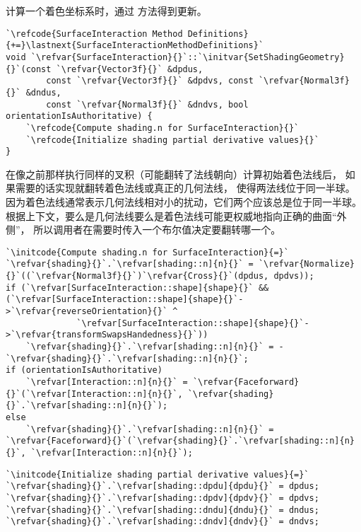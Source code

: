 计算一个着色坐标系时，通过
方法得到更新。
\begin{lstlisting}
`\refcode{SurfaceInteraction Method Definitions}{+=}\lastnext{SurfaceInteractionMethodDefinitions}`
void `\refvar{SurfaceInteraction}{}`::`\initvar{SetShadingGeometry}{}`(const `\refvar{Vector3f}{}` &dpdus,
        const `\refvar{Vector3f}{}` &dpdvs, const `\refvar{Normal3f}{}` &dndus,
        const `\refvar{Normal3f}{}` &dndvs, bool orientationIsAuthoritative) {
    `\refcode{Compute shading.n for SurfaceInteraction}{}`
    `\refcode{Initialize shading partial derivative values}{}`
}
\end{lstlisting}

在像之前那样执行同样的叉积（可能翻转了法线朝向）计算初始着色法线后，
如果需要的话实现就翻转着色法线或真正的几何法线，
使得两法线位于同一半球。
因为着色法线通常表示几何法线相对小的扰动，它们两个应该总是位于同一半球。
根据上下文，要么是几何法线要么是着色法线可能更权威地指向正确的曲面“外侧”，
所以调用者在需要时传入一个布尔值决定要翻转哪一个。
\begin{lstlisting}
`\initcode{Compute shading.n for SurfaceInteraction}{=}`
`\refvar{shading}{}`.`\refvar[shading::n]{n}{}` = `\refvar{Normalize}{}`((`\refvar{Normal3f}{}`)`\refvar{Cross}{}`(dpdus, dpdvs));
if (`\refvar[SurfaceInteraction::shape]{shape}{}` && (`\refvar[SurfaceInteraction::shape]{shape}{}`->`\refvar{reverseOrientation}{}` ^
              `\refvar[SurfaceInteraction::shape]{shape}{}`->`\refvar{transformSwapsHandedness}{}`))
    `\refvar{shading}{}`.`\refvar[shading::n]{n}{}` = -`\refvar{shading}{}`.`\refvar[shading::n]{n}{}`;
if (orientationIsAuthoritative)
    `\refvar[Interaction::n]{n}{}` = `\refvar{Faceforward}{}`(`\refvar[Interaction::n]{n}{}`, `\refvar{shading}{}`.`\refvar[shading::n]{n}{}`);
else
    `\refvar{shading}{}`.`\refvar[shading::n]{n}{}` = `\refvar{Faceforward}{}`(`\refvar{shading}{}`.`\refvar[shading::n]{n}{}`, `\refvar[Interaction::n]{n}{}`);
\end{lstlisting}
\begin{lstlisting}
`\initcode{Initialize shading partial derivative values}{=}`
`\refvar{shading}{}`.`\refvar[shading::dpdu]{dpdu}{}` = dpdus;
`\refvar{shading}{}`.`\refvar[shading::dpdv]{dpdv}{}` = dpdvs;
`\refvar{shading}{}`.`\refvar[shading::dndu]{dndu}{}` = dndus;
`\refvar{shading}{}`.`\refvar[shading::dndv]{dndv}{}` = dndvs;
\end{lstlisting}

